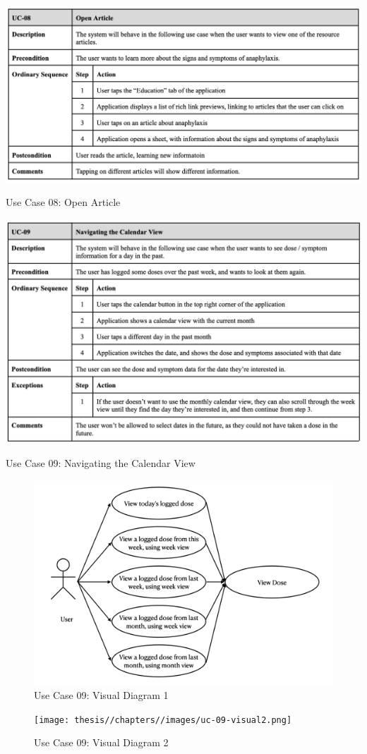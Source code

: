\begin{table} [H]
    \centering
    \includegraphics[width=1\linewidth]{thesis//chapters//images/uc-08.png}
    \caption{Use Case 08: Open Article}
    \label{fig:uc08-table}
\end{table}

\begin{table} [H]
    \centering
    \includegraphics[width=1\linewidth]{thesis//chapters//images/uc-09.png}
    \caption{Use Case 09: Navigating the Calendar View}
    \label{fig:uc09-table}
\end{table}

\begin{figure} [H]
    \centering
    \includegraphics[width=0.75\linewidth]{thesis//chapters//images/uc-09-visual1.png}
    \caption{Use Case 09: Visual Diagram 1}
    \label{fig:uc09-visual-diagram1}
\end{figure}

\begin{figure} [H]
    \centering
    \texttt{[image: thesis//chapters//images/uc-09-visual2.png]}
    \caption{Use Case 09: Visual Diagram 2}
    \label{fig:uc09-visual-diagram2}
\end{figure}



